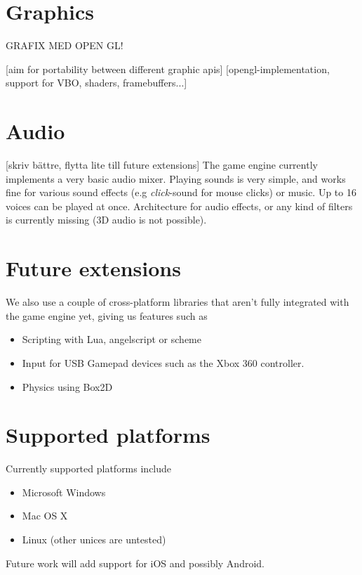 \section{Graphics}
GRAFIX MED OPEN GL!

[aim for portability between different graphic apis]
[opengl-implementation, support for VBO, shaders, framebuffers...]

\section{Audio}
[skriv bättre, flytta lite till future extensions]
The game engine currently implements a very basic audio mixer. Playing sounds is very simple, and works fine
for various sound effects (e.g \textit{click}-sound for mouse clicks) or music. Up to 16 voices can be played at once. Architecture for audio effects, or any kind of filters is currently missing (3D audio is not possible).

\section{Future extensions}

We also use a couple of cross-platform libraries that aren't fully integrated with the game engine yet, giving us features such as
\begin{itemize}
\item Scripting with Lua, angelscript or scheme
\item Input for USB Gamepad devices such as the Xbox 360 controller.
\item Physics using Box2D
\end{itemize}

\section{Supported platforms}
Currently supported platforms include
\begin{itemize}
\item Microsoft Windows
\item Mac OS X
\item Linux (other unices are untested)
\end{itemize}
Future work will add support for iOS and possibly Android.

